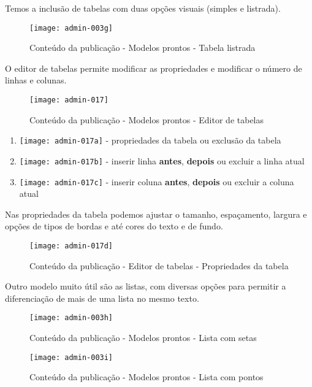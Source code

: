 Temos a inclusão de tabelas com duas opções visuais (simples e listrada).

\begin{figure}[!ht]
    \centering
    \texttt{[image: admin-003g]}
    \caption{Conteúdo da publicação - Modelos prontos - Tabela listrada}\label{RS0006:fig:admin-003g}
\end{figure}

O editor de tabelas permite modificar as propriedades e modificar o número de linhas e colunas.

\begin{figure}[!ht]
    \centering
    \texttt{[image: admin-017]}
    \caption{Conteúdo da publicação - Modelos prontos - Editor de tabelas}\label{RS0006:fig:admin-017}
\end{figure}

\begin{enumerate}
    \item {\texttt{[image: admin-017a]}} - propriedades da tabela ou exclusão da tabela
    \item {\texttt{[image: admin-017b]}} - inserir linha \textbf{antes}, \textbf{depois} ou excluir a linha atual
    \item {\texttt{[image: admin-017c]}} - inserir coluna \textbf{antes}, \textbf{depois} ou excluir a coluna atual
\end{enumerate}

Nas propriedades da tabela podemos ajustar o tamanho, espaçamento, largura e opções de tipos de bordas e até cores do texto e de fundo.

\begin{figure}[!ht]
    \centering
    \texttt{[image: admin-017d]}
    \caption{Conteúdo da publicação - Editor de tabelas - Propriedades da tabela}\label{RS0006:fig:admin-017d}
\end{figure}

Outro modelo muito útil são as listas, com diversas opções para permitir a diferenciação de mais de uma lista no mesmo texto.

\begin{figure}[!ht]
    \centering
    \texttt{[image: admin-003h]}
    \caption{Conteúdo da publicação - Modelos prontos - Lista com setas}\label{RS0006:fig:admin-003h}
\end{figure}

\begin{figure}[!ht]
    \centering
    \texttt{[image: admin-003i]}
    \caption{Conteúdo da publicação - Modelos prontos - Lista com pontos}\label{RS0006:fig:admin-003i}
\end{figure}

